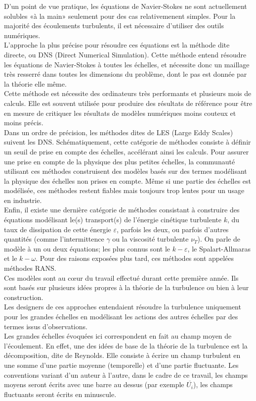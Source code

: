 \documentclass[a4paper,12pt]{article}
\newcommand{\keps}{$k-\varepsilon$}
\newcommand{\NS}{Navier-Stokes}
\numberwithin{equation}{section} %
\begin{document}
D'un point de vue pratique, les équations de \NS $ $ ne sont actuellement solubles «à la main» seulement pour des cas relativemenent simples. Pour la majorité des écoulements turbulents, il est nécessaire d'utiliser des outils numériques.\\
L'approche la plus précise pour résoudre ces équations est la méthode dite directe, ou DNS (Direct Numerical Simulation). Cette méthode entend résoudre les équations de \NS $ $ à toutes les échelles, et nécessite donc un maillage très resserré dans toutes les dimensions du problème, dont le pas est donnée par la théorie elle même. \\
Cette méthode est nécessite des ordinateurs très performants et plusieurs mois de calculs. Elle est souvent utilisée pour produire des résultats de référence pour être en mesure de critiquer les résultats de modèles numériques moins couteux et moins précis.\\
Dans un ordre de précision, les méthodes dites de LES (Large Eddy Scales) suivent les DNS. Schématiquement, cette catégorie de méthodes consiste à définir un seuil de prise en compte des échelles, accélérant ainsi les calculs. Pour assurer une prise en compte de la physique des plus petites échelles, la communauté utilisant ces méthodes construisent des modèles basés sur des termes modélisant la physique des échelles non prises en compte. Même si une partie des échelles est modélisée, ces méthodes restent fiables mais toujours 
trop lentes pour un usage en industrie.\\

 Enfin, il existe une dernière catégorie de méthodes consistant à construire des équations modélisant le(s) transport(s) de l'énergie cinétique turbulente $k$, du taux de dissipation de cette énergie $\varepsilon$, parfois les deux, ou parfois d'autres quantités (comme l'intermittence $\gamma$ ou la viscosité turbulente $\nu_T$). On parle de modèle à un ou deux équations; les plus connus sont le \keps, le Spalart-Allmaras et le $k-\omega$. Pour des raisons exposées plus tard, ces méthodes sont appelées méthodes RANS.\\
Ces modèles sont au cœur du travail effectué durant cette première année. Ils sont basés sur plusieurs idées propres à la théorie de la turbulence ou bien à leur construction.\\
 
\noindent Les designers de ces approches entendaient résoudre la turbulence uniquement pour les grandes échelles en modélisant les actions des autres échelles par des termes issus d'observations.\\
Les grandes échelles évoquées ici correspondent en fait au champ moyen de l'écoulement. En effet, une des idées de base de la théorie de la turbulence est la décomposition, dite de Reynolds. Elle consiste à écrire un champ turbulent en une somme d'une partie moyenne (temporelle) et d'une partie fluctuante. Les conventions variant d'un auteur à l'autre, dans le cadre de ce travail, les champs moyens seront écrits avec une barre au dessus (par exemple $\overline{U_i}$), les champs fluctuants seront écrits en minuscule.\\
\end{document}
